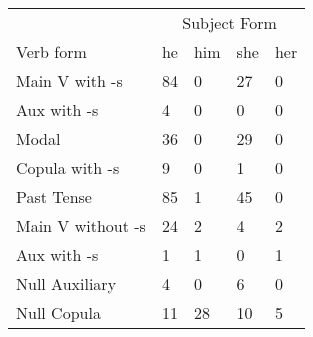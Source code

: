 \begin{table}[]
\begin{minipage}{0.5\textwidth}
\end{minipage}
\begin{minipage}{0.5\textwidth}
    \centering
    \begin{tabular}{@{}lllll@{}}
        \toprule
            &\multicolumn{4}{c}{Subject Form}\\
            \cline{2-5}
        Verb form & he & him & she & her \\
        \midrule
        Main V with -s & 84 & 0 & 27 & 0 \\
        Aux with -s & 4 & 0 & 0 & 0 \\
        Modal & 36 & 0 & 29 & 0 \\
        Copula with -s & 9 & 0 & 1 & 0 \\
        Past Tense & 85 & 1 & 45 & 0 \\
        \hline
        Main V without -s & 24 & 2 & 4 & 2 \\
        Aux with -s & 1 & 1 & 0 & 1 \\
        Null Auxiliary & 4 & 0 & 6 & 0 \\
        Null Copula & 11 & 28 & 10 & 5 \\
        \bottomrule
    \end{tabular}
\end{minipage}
\end{table}
